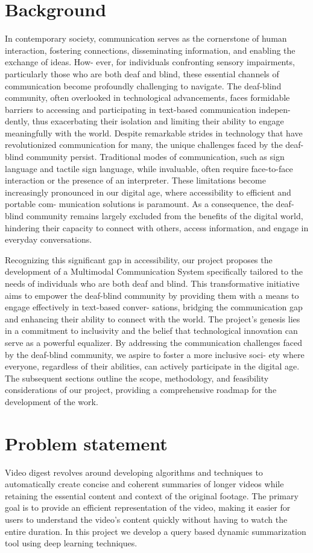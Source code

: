 \documentclass[12pt,a4paper]{report}
\begin{document}
\section{Background}
In contemporary society, communication serves as the cornerstone of human interaction,
fostering connections, disseminating information, and enabling the exchange of ideas. How-
ever, for individuals confronting sensory impairments, particularly those who are both deaf
and blind, these essential channels of communication become profoundly challenging to
navigate. The deaf-blind community, often overlooked in technological advancements, faces
formidable barriers to accessing and participating in text-based communication indepen-
dently, thus exacerbating their isolation and limiting their ability to engage meaningfully
with the world.
Despite remarkable strides in technology that have revolutionized communication for
many, the unique challenges faced by the deaf-blind community persist. Traditional modes
of communication, such as sign language and tactile sign language, while invaluable, often
require face-to-face interaction or the presence of an interpreter. These limitations become
increasingly pronounced in our digital age, where accessibility to efficient and portable com-
munication solutions is paramount. As a consequence, the deaf-blind community remains
largely excluded from the benefits of the digital world, hindering their capacity to connect
with others, access information, and engage in everyday conversations.

Recognizing this significant gap in accessibility, our project proposes the development of
a Multimodal Communication System specifically tailored to the needs of individuals who
are both deaf and blind. This transformative initiative aims to empower the deaf-blind
community by providing them with a means to engage effectively in text-based conver-
sations, bridging the communication gap and enhancing their ability to connect with the
world. The project’s genesis lies in a commitment to inclusivity and the belief that technological innovation can serve as a powerful equalizer. By addressing the communication
challenges faced by the deaf-blind community, we aspire to foster a more inclusive soci-
ety where everyone, regardless of their abilities, can actively participate in the digital age.
The subsequent sections outline the scope, methodology, and feasibility considerations of
our project, providing a comprehensive roadmap for the development of the work.

\section{Problem statement }
Video digest revolves around developing algorithms and techniques to automatically create concise and coherent summaries of longer videos while retaining the essential content and context of the original footage. The primary goal is to provide an efficient representation of the video, making it easier for users to understand the video's content quickly without having to watch the entire duration. In this project we develop a query based dynamic summarization tool using deep learning techniques. 
\end{document}
